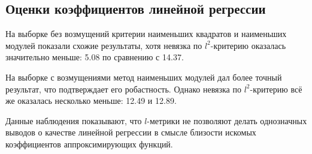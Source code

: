 \subsection{Оценки коэффициентов линейной регрессии}

На выборке без возмущений критерии наименьших квадратов и наименьших модулей показали схожие результаты, хотя невязка по $l^2$-критерию оказалась значительно меньше: 5.08 по сравнению с 14.37.

На выборке с возмущениями метод наименьших модулей дал более точный результат, что подтверждает его робастность. Однако невязка по $l^2$-критерию всё же оказалась несколько меньше: 12.49 и 12.89.

Данные наблюдения показывают, что  $l$-метрики не позволяют делать однозначных выводов о качестве линейной регрессии в смысле близости искомых коэффициентов аппроксимирующих функций.